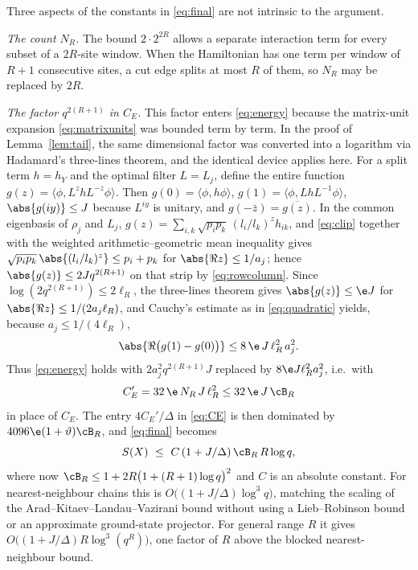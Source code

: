\begin{remark}\label{rem:sharper}
Three aspects of the constants in \eqref{eq:final} are not intrinsic to
the argument.

\emph{The count $N_R$.} The bound $2\cdot2^{2R}$ allows a separate
interaction term for every subset of a $2R$-site window. When the
Hamiltonian has one term per window of $R+1$ consecutive sites, a cut edge
splits at most $R$ of them, so $N_R$ may be replaced by $2R$.

\emph{The factor $q^{2(R+1)}$ in $C_E$.} This factor enters
\eqref{eq:energy} because the matrix-unit expansion \eqref{eq:matrixunits}
was bounded term by term. In the proof of Lemma~\ref{lem:tail}, the same
dimensional factor was converted into a logarithm via Hadamard's
three-lines theorem, and the identical device applies here. For a split
term $h=h_Y$ and the optimal filter $L=L_j$, define the entire function
$g(z)=\langle\phi,L^zhL^{-z}\phi\rangle$. Then
$g(0)=\langle\phi,h\phi\rangle$, $g(1)=\langle\phi,LhL^{-1}\phi\rangle$,
$\abs{g(iy)}\le J$ because $L^{iy}$ is unitary, and
$g(-\bar z)=\overline{g(z)}$. In the common eigenbasis of $\rho_j$ and $L_j$,
$g(z)=\sum_{i,k}\sqrt{p_ip_k}\,(l_i/l_k)^zh_{ik}$, and \eqref{eq:clip}
together with the weighted arithmetic--geometric mean inequality gives
$\sqrt{p_ip_k}\,\abs{(l_i/l_k)^z}\le p_i+p_k$ for $\abs{\Re z}\le1/a_j$;
hence $\abs{g(z)}\le 2Jq^{2(R+1)}$ on that strip by \eqref{eq:rowcolumn}.
Since $\log(2q^{2(R+1)})\le2\ell_R$, the three-lines theorem gives
$\abs{g(z)}\le\e J$ for $\abs{\Re z}\le 1/(2a_j\ell_R)$, and Cauchy's
estimate as in \eqref{eq:quadratic} yields, because $a_j\le1/(4\ell_R)$,
\[
 \abs{\Re\bigl(g(1)-g(0)\bigr)}\le 8\,\e\,J\,\ell_R^2\,a_j^2 .
\]
Thus \eqref{eq:energy} holds with $2a_j^2q^{2(R+1)}J$ replaced by
$8\e J\ell_R^2a_j^2$, i.e.\ with
\[
 C_E'=32\,\e\,N_R\,J\,\ell_R^2\le 32\,\e\,J\,\cB_R
\]
in place of $C_E$. The entry $4C_E'/\Delta$ in \eqref{eq:CE} is then
dominated by $4096\e(1+\vartheta)\cB_R$, and \eqref{eq:final} becomes
\[
 S(X)\ \le\ C\,(1+J/\Delta)\,\cB_R\,R\log q,
\]
where now $\cB_R\le 1+2R\bigl(1+(R+1)\log q\bigr)^2$ and $C$ is an absolute
constant.
For nearest-neighbour chains this is
$O\bigl((1+J/\Delta)\log^3q\bigr)$, matching the scaling of the
Arad--Kitaev--Landau--Vazirani bound \cite{AKLV} without using a
Lieb--Robinson bound or an approximate ground-state projector. For general
range $R$ it gives $O\bigl((1+J/\Delta)R\log^3(q^R)\bigr)$, one factor of
$R$ above the blocked nearest-neighbour bound.


\end{remark}
